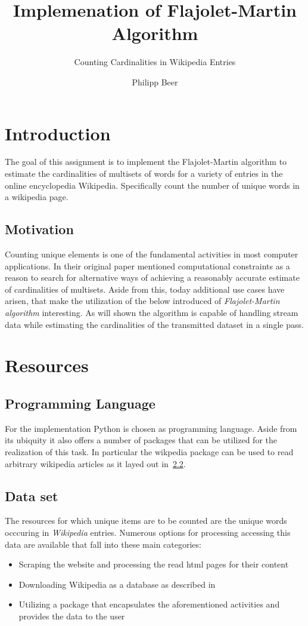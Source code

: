 \documentclass[11pt]{article}
\title{Implemenation of Flajolet-Martin Algorithm}
\author{Philipp Beer}
\subtitle{Counting Cardinalities in Wikipedia Entries}
\begin{document}
\maketitle
\tableofcontents
\clearpage\null\newpage
\section{Introduction}
The goal of this assignment is to implement the Flajolet-Martin algorithm to estimate the cardinalities of multisets of words for a variety of entries in the online encyclopedia Wikipedia. Specifically count the number of unique words in a wikipedia page.

\subsection{Motivation}
Counting unique elements is one of the fundamental activities in most computer applications. In their original paper \cite{bib:fm85} mentioned computational constraints as a reason to search for alternative ways of achieving a reasonably accurate estimate of cardinalities of multisets. Aside from this, today additional use cases have arisen, that make the utilization of the below introduced of \emph{Flajolet-Martin algorithm} interesting. As will shown the algorithm is capable of handling stream data while estimating the cardinalities of the transmitted dataset in a single pass.


\section{Resources}
\subsection{Programming Language}
For the implementation Python is chosen as programming language. Aside from its ubiquity it also offers a number of packages that can be utilized for the realization of this task. In particular the wikpedia package \cite{bib:goldsmith} can be used to read arbitrary wikipedia articles as it layed out in~\ref{subsec:data}. 

\subsection{Data set}
\label{subsec:data}
The resources for which unique items are to be counted are the unique words occcuring in \emph{Wikipedia} entries. Numerous options for processing accessing this data are available that fall into these main categories:
\begin{itemize}
  \item Scraping the website and processing the read html pages for their content
\item Downloading Wikipedia as a database as described in \cite{bib:wikidl}
  \item Utilizing a package that encapsulates the aforementioned activities and provides the data to the user
\end{itemize}
\end{document}
